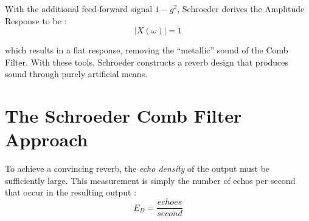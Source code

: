 With the additional feed-forward signal $1-g^2$, Schroeder derives the Amplitude Response to be \cite{schroeder1961natural}:
\begin{equation}\label{comb}
	|X(\omega)|=1
\end{equation}

which results in a flat response, removing the ``metallic'' sound of the Comb Filter. With these tools, Schroeder constructs a reverb design that produces sound through purely artificial means.


\section{The Schroeder Comb Filter Approach}
To achieve a convincing reverb, the \textit{echo density} of the output must be sufficiently large. This measurement is simply the number of echos per second that occur in the resulting output \cite{pirkle2019designing}:
\begin{equation}\label{comb}
	E_D=\frac{echoes}{second}
\end{equation}

